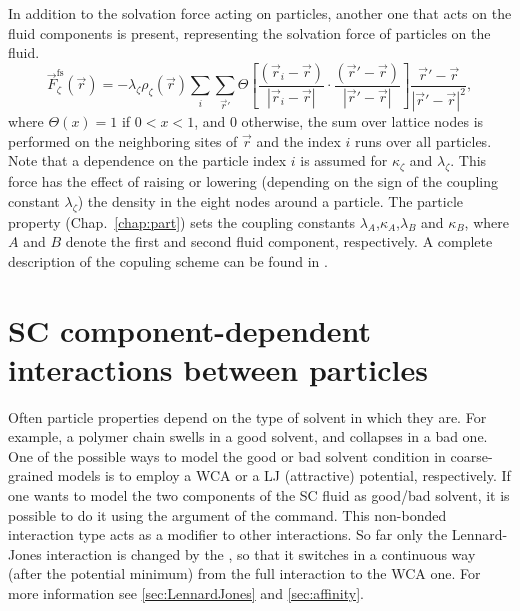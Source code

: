 In addition to the solvation force acting on particles, another one
that acts on the fluid components is present, representing the
solvation force of particles on the fluid.
\begin{equation}
  \vec{F}_{\zeta}^{\mathrm{fs}}(\vec{r}) = -\lambda_{\zeta} \rho_{\zeta}(\vec{r}) \sum_i \sum_{\vec{r}'} \Theta \left[\frac{(\vec{r}_i-\vec{r})}{|\vec{r}_i-\vec{r}|} \cdot \frac{(\vec{r}'-\vec{r})}{|\vec{r}'-\vec{r}|} \right] \frac{\vec{r}'-\vec{r}}{|\vec{r}'-\vec{r}|^2},
\end{equation}
where $\Theta(x)=1$ if $0<x<1$, and 0 otherwise, the sum over lattice
nodes is performed on the neighboring sites of $\vec{r}$ and the index
$i$ runs over all particles. Note that a dependence on the particle
index $i$ is assumed for $\kappa_\zeta$ and $\lambda_\zeta$.  This
force has the effect of raising or lowering (depending on the sign of
the coupling constant $\lambda_\zeta$) the density in the eight nodes
around a particle.  The particle property 
(Chap.~\ref{chap:part}) sets the coupling constants
$\lambda_A$,$\kappa_A$,$\lambda_B$ and $\kappa_B$, where $A$ and $B$
denote the first and second fluid component, respectively.  A complete
description of the copuling scheme can be found in \cite{sega13c}.

\section{SC component-dependent interactions between particles}
\label{sec:scmd-affinity}

Often particle properties depend on the type of solvent in which they
are. For example, a polymer chain swells in a good solvent, and
collapses in a bad one. One of the possible ways to model the good or
bad solvent condition in coarse-grained models is to employ a WCA or a
LJ (attractive) potential, respectively. If one wants to model the two
components of the SC fluid as good/bad solvent, it is possible to do
it using the  argument of the  command. This
non-bonded interaction type acts as a modifier to other
interactions. So far only the Lennard-Jones interaction is changed by
the , so that it switches in a continuous way (after the
potential minimum) from the full interaction to the WCA one. For more
information see \ref{sec:LennardJones} and \ref{sec:affinity}.

